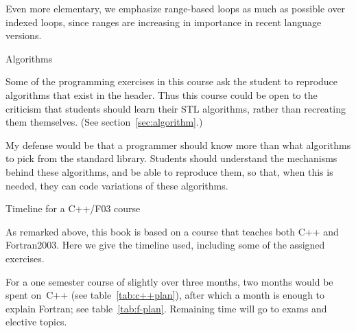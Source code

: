 Even more elementary, we emphasize range-based loops as much as
possible over indexed loops, since ranges are increasing in importance
in recent language versions.

 {Algorithms}

Some of the programming exercises in this course
ask the student to reproduce algorithms
that exist in the  header.
Thus this course could be open to the criticism that
students should learn their \ac{STL} algorithms,
rather than recreating them themselves.
(See section~\ref{sec:algorithm}.)

My defense would be that a programmer should know
more than what algorithms to pick from the standard library.
Students should understand the mechanisms behind these algorithms,
and be able to reproduce them, so that, when this is needed,
they can code variations of these algorithms.

 {Timeline for a C++/F03 course}

As remarked above, this book is based on a course that teaches both
C++ and Fortran2003. Here we give the timeline used, including some of
the assigned exercises.

For a one semester course of slightly over three months, two months
would be spent on~C++ (see table~\ref{tab:c++plan}), after which a
month is enough to explain Fortran; see table~\ref{tab:f-plan}.
Remaining time will go to exams
and elective topics.


